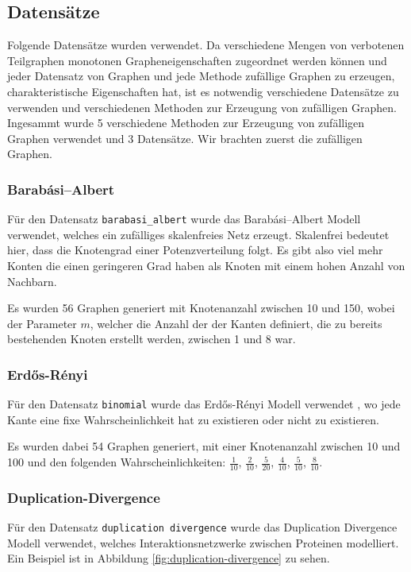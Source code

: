 \documentclass[12pt,a4paper,onecolumn,oneside,titlepage]{article}
\newcommand{\vars}{\texttt}
\begin{document}
\subsection{Datensätze}
Folgende Datensätze wurden verwendet. Da verschiedene Mengen von verbotenen Teilgraphen monotonen Grapheneigenschaften zugeordnet werden können und jeder Datensatz von Graphen und jede Methode zufällige Graphen zu erzeugen, charakteristische Eigenschaften hat, ist es notwendig verschiedene Datensätze zu verwenden und verschiedenen Methoden zur Erzeugung von zufälligen Graphen.
Ingesammt wurde 5 verschiedene Methoden zur Erzeugung von zufälligen Graphen verwendet und 3 Datensätze.
Wir brachten zuerst die zufälligen Graphen.


\subsubsection{Barabási–Albert}
Für den Datensatz \vars{barabasi\_albert} wurde das Barabási–Albert Modell verwendet, welches ein zufälliges skalenfreies Netz erzeugt.\cite{Albert02}
Skalenfrei bedeutet hier, dass die Knotengrad einer Potenzverteilung folgt. Es gibt also viel mehr Konten die einen geringeren Grad haben als Knoten mit einem hohen Anzahl von Nachbarn. 

Es wurden 56 Graphen generiert mit Knotenanzahl zwischen 10 und 150, wobei der Parameter $m$, welcher die Anzahl der der Kanten definiert, die zu bereits bestehenden Knoten erstellt werden, zwischen 1 und 8 war.
\subsubsection{Erdős-Rényi}
Für den Datensatz \vars{binomial} wurde das Erdős-Rényi Modell verwendet\cite{Gilbert59} \cite{Batagelj05}, wo jede Kante eine fixe Wahrscheinlichkeit hat zu existieren oder nicht zu existieren.

Es wurden dabei 54 Graphen generiert, mit einer Knotenanzahl zwischen 10 und 100 und den folgenden Wahrscheinlichkeiten: $\frac{1}{10}$, $\frac{2}{10}$, $\frac{5}{20}$, $\frac{4}{10}$, $\frac{5}{10}$, $\frac{8}{10}$.


\subsubsection{Duplication-Divergence}
Für den Datensatz \vars{duplication divergence} wurde das Duplication Divergence Modell verwendet\cite{Ispolatov05}, welches Interaktionsnetzwerke zwischen Proteinen modelliert. Ein Beispiel ist in Abbildung \ref{fig:duplication-divergence} zu sehen.
\end{document}

